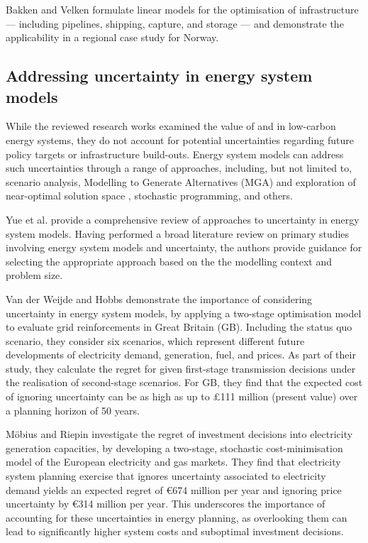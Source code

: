 \documentclass[preprint,12pt,sort&compress]{elsarticle}
\begin{document}
Bakken and Velken \cite{bakkenLinearModelsOptimization2008} formulate linear models for the optimisation of  infrastructure --- including pipelines, shipping,  capture, and storage --- and demonstrate the applicability in a regional case study for Norway.
\cite{birgeValueStochasticSolution1982,birgeIntroductionStochasticProgramming2011,fodstadStochasticModelingNatural2016,mobiusRegretAnalysisInvestment2020,vanderweijdeEconomicsPlanningElectricity2012} 
\subsection{Addressing uncertainty in energy system models}
While the reviewed research works examined the value of  and  in low-carbon energy systems, they do not account for potential uncertainties regarding future policy targets or infrastructure build-outs. 
Energy system models can address such uncertainties through a range of approaches, including, but not limited to, scenario analysis, Modelling to Generate Alternatives (MGA) and exploration of near-optimal solution space \cite{neumannNearoptimalFeasibleSpace2021,vangreevenbroekLittleLoseCase2025,priceModellingGenerateAlternatives2017}, stochastic programming, and others. 

Yue et al. \cite{yueReviewApproachesUncertainty2018} provide a comprehensive review of approaches to uncertainty in energy system models. Having performed a broad literature review on primary studies involving energy system models and uncertainty, the authors provide guidance for selecting the appropriate approach based on the the modelling context and problem size.

Van der Weijde and Hobbs \cite{vanderweijdeEconomicsPlanningElectricity2012} demonstrate the importance of considering uncertainty in energy system models, by applying a two-stage optimisation model to evaluate grid reinforcements in Great Britain (GB). Including the status quo scenario, they consider six scenarios, which represent different future developments of electricity demand, generation, fuel, and  prices. As part of their study, they calculate the regret for given first-stage transmission decisions under the realisation of second-stage scenarios. For GB, they find that the expected cost of ignoring uncertainty can be as high as up to \pounds{111} million (present value) over a planning horizon of 50 years.

Möbius and Riepin \cite{mobiusRegretAnalysisInvestment2020} investigate the regret of investment decisions into electricity generation capacities, by developing a two-stage, stochastic cost-minimisation model of the European electricity and gas markets. They find that electricity system planning exercise that ignores uncertainty associated to electricity demand yields an expected regret of \euro{674} million per year and ignoring  price uncertainty by \euro{314} million per year. This underscores the importance of accounting for these uncertainties in energy planning, as overlooking them can lead to significantly higher system costs and suboptimal investment decisions. 
\end{document}
